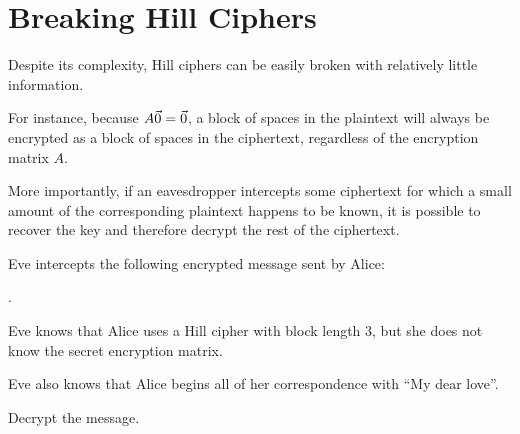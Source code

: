 \documentclass{ximera}
\begin{document}
\section*{Breaking Hill Ciphers}

Despite its complexity, Hill ciphers can be easily broken with relatively little information. 

For
instance, because $A\vec{0}=\vec{0}$, a block of spaces in the plaintext
will always be encrypted as a block of spaces in the ciphertext,
regardless of the encryption matrix $A$. 

More importantly, if an eavesdropper intercepts
some ciphertext for which a small amount of the corresponding
plaintext happens to be known, it is possible to recover
the key and therefore decrypt the rest of the ciphertext. 

\begin{example}\label{ex:hill-cipher-cryptanalysis}
  Eve intercepts the following encrypted message sent by Alice:%
  \begin{center}
    .
  \end{center}
  Eve knows that Alice uses a Hill cipher with block length 3, but she
  does not know the secret encryption matrix. 
  
  Eve also knows that
  Alice begins all of her correspondence with ``My dear
  love''. 
  
  Decrypt the message.
\end{example}
\end{document}
